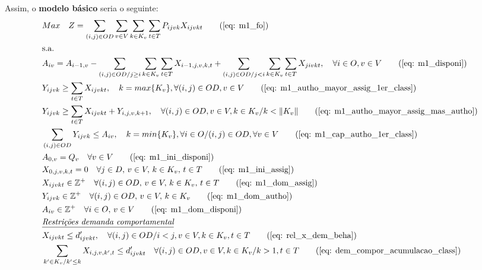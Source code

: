 Assim, o \textbf{modelo básico} seria o seguinte:
\allowdisplaybreaks
\begin{align}
	& Max \quad Z = \sum_{(i,j)\in OD} \sum_{v\in V} \sum_{k\in K_v} \sum_{t\in T} P_{ijvk} X_{ijvkt}     \tag{\ref{eq: m1_fo}}   \\
	& \text{s.a.}  \notag \\
	& A_{iv} = A_{i-1,v} - \sum_{(i,j) \in OD/j \geq i} \sum_{k\in K_v}\sum_{t\in T}X_{i-1,j,v,k,t} + \sum_{(i,j) \in OD/j<i} \sum_{k\in K_v}\sum_{t\in T}X_{jivkt}, \quad \forall i \in O, v \in V   \tag{\ref{eq: m1_disponi}} \\
	& Y_{ijvk} \geq  \sum_{t \in T} X_{ijvkt},  \quad k = max\{K_v\}, \forall(i,j) \in OD ,v \in V     \tag{\ref{eq: m1_autho_mayor_assig_1er_class}} \\
	& Y_{ijvk} \geq  \sum_{t \in T} X_{ijvkt} + Y_{i,j,v,k + 1} , \quad \forall(i,j) \in OD, v \in V, k \in K_v / k < \lVert K_v \rVert   \tag{\ref{eq: m1_autho_mayor_assig_mas_autho}} \\
	& \sum_{(i,j) \in OD} Y_{ijvk} \leq A_{iv}, \quad  k = min\{K_v\}, \forall i \in O / (i,j) \in OD,   \forall v \in V       \tag{\ref{eq: m1_cap_autho_1er_class}} \\
	& A_{0,v} = Q_v \quad \forall v \in V  \tag{\ref{eq: m1_ini_disponi}} \\ 
	& X_{0,j,v,k,t} = 0 \quad \forall j \in D,\, v \in V,\, k \in K_v,\, t \in T  \tag{\ref{eq: m1_ini_assig}} \\ 
	& X_{ijvkt} \in \mathbb{Z}^+ \quad \forall(i,j) \in OD,\, v \in V,\, k \in K_v,\, t \in T  \tag{\ref{eq: m1_dom_assig}} \\ 
	& Y_{ijvk} \in \mathbb{Z}^+ \quad \forall(i,j) \in OD,\, v \in V,\, k \in K_v  \tag{\ref{eq: m1_dom_autho}} \\ 
	& A_{iv} \in \mathbb{Z}^+ \quad \forall i \in O,\, v \in V  \tag{\ref{eq: m1_dom_disponi}} \\
	& \textit{\underline{Restrições demanda comportamental}}         \notag   \\
	& X_{ijvkt} \leq d'_{ijvkt},  \quad \forall (i,j) \in OD / i < j  ,v \in V, k \in K_v, t\in T   \tag{\ref{eq: rel_x_dem_beha}} \\
	& \sum_{k' \in K_v / k' \leq k}X_{i,j,v,k',t} \leq d'_{ijvkt} \quad \forall (i,j) \in OD, v \in V, k \in K_v / k > 1, t\in T     \tag{\ref{eq: dem_compor_acumulacao_class}} \\

\end{align}
